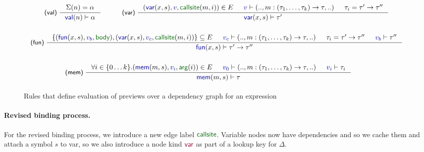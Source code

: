 \documentclass[acmsmall,anonymous,fleqn]{acmart}\settopmatter{printfolios=false,printccs=false,printacmref=false}
\theoremstyle{plain}
\theoremstyle{definition}
\newcommand{\bndclr}[1]{\textcolor{kvdclr}{#1}}
\newcommand{\bnd}[1]{\textnormal{\textcolor{kvdclr}{\sffamily #1}}}
\newcommand{\bknd}[1]{\textnormal{\textcolor{prepclr}{\sffamily #1}}}
\newcommand{\blbl}[1]{\textnormal{\textcolor{numclr}{\sffamily #1}}}
\newcommand{\rname}[1]{{\sffamily\small(#1)}}
\begin{document}

\begin{figure}
\vspace{0.5em}
\begin{equation*}
\begin{array}{l}
\qquad\inference[\rname{val}~]
  {\Sigma(n) = \alpha}
  {\bnd{val}(n) \vdash \alpha }
\quad\qquad
\inference[\rname{var}~]
  { (\bnd{var}(x,s), \bndclr{v}, \blbl{callsite}(m, i)) \in E &
    \bndclr{v} \vdash (.., m:(\tau_1, \ldots, \tau_k)\rightarrow \tau,..) & \tau_i=\tau'\rightarrow\tau'' }
  { \bnd{var}(x, s) \vdash \tau' }
\\[2.5em]
\inference[\rname{fun}~]
  { \{(\bnd{fun}(x,s), \bndclr{v_b}, \blbl{body}), (\bnd{var}(x,s), \bndclr{v_c}, \blbl{callsite}(m, i))\} \subseteq E &
    \bndclr{v_c} \vdash (.., m:(\tau_1, \ldots, \tau_k)\rightarrow \tau,..) &
    \tau_i=\tau'\rightarrow\tau'' & \bndclr{v_b} \vdash \tau'' }
  { \bnd{fun}(x, s) \vdash \tau' \rightarrow \tau'' }
\\[2.5em]
\qquad\qquad\quad\inference[\rname{mem}~]
  { \forall i\in\{0\ldots k\}.(\bnd{mem}(m, s), \bndclr{v_i}, \blbl{arg}(i)) \in E &
    \bndclr{v_0} \vdash (.., m:(\tau_1, \ldots, \tau_k) \rightarrow \tau, ..)& \bndclr{v_i} \vdash \tau_i }
  { \bnd{mem}(m, s) \vdash \tau }
\\[1em]
\end{array}
\end{equation*}
\caption{Rules that define evaluation of previews over a dependency graph for an expression}
\vspace{0.5em}
\label{fig:tc}
\end{figure}


\paragraph{Revised binding process.}
For the revised binding process, we introduce a new edge label $\blbl{callsite}$. Variable nodes
now have dependencies and so we cache them and attach a symbol $s$ to \bnd{var}, so we also
introduce a node kind $\bknd{var}$ as part of a lookup key for $\Delta$.
\end{document}
